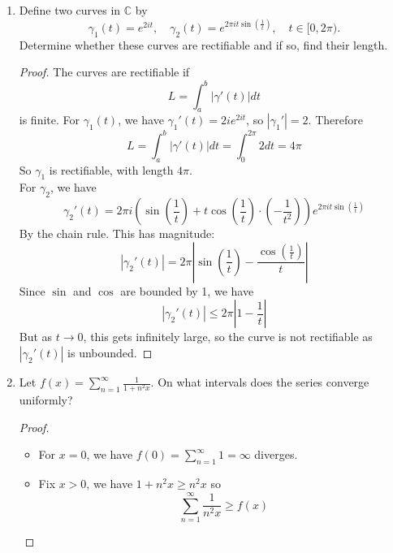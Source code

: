 \documentclass[hidelinks,12pt]{article}
\renewcommand{\geq}{\geqslant}
\renewcommand{\leq}{\leqslant}
\begin{document}
\begin{enumerate}
\begin{proof}
       \begin{align*}
       x_{n+1}f'(x_{n+1})&\geq x_{n+1}f'(x_{n})\\
                       &\geq x_{n}f'(x_{n})\tag{\(x_{n}\leq x_{n+1}\) and \(f'\) monotonic}\\
       &\geq f(x_{n})\tag{Assumption}\\
       &\geq f(x_{n+1})\tag{\(f\) nondecreasing}
       \end{align*}
       So \(xf'(x)\geq f(x)\) for all \(x\) therefore \(g'\) is nonnegative, so \(g\) is monotone increasing.
        \end{proof}
    \item Define two curves in \(\mathbb{C}\) by
        \[
            \gamma_{1}(t)=e^{2it},\quad\gamma_{2}(t)=e^{2\pi it\sin\left( \frac{1}{t} \right)},\quad t\in[0,2\pi).
        \]
        Determine whether these curves are rectifiable and if so, find their length.
        \begin{proof}
       The curves are rectifiable if \[
       L=\int_{a}^{b}|\gamma'(t)|dt
       \]
       is finite. For \(\gamma_{1}(t)\), we have \(\gamma_{1}'(t)=2ie^{2it}\), so \(|\gamma_{1}'|=2\). Therefore \[
       L=\int_{a}^{b}|\gamma'(t)|dt=\int_{0}^{2\pi}2dt=4\pi
       \]
      So \(\gamma_{1}\) is rectifiable, with length \(4\pi\).\\
      For \(\gamma_{2}\), we have \[
      \gamma_{2}'(t)=2\pi i\left(\sin\left(\frac{1}{t}\right)+t\cos\left(\frac{1}{t}\right)\cdot\left(-\frac{1}{t^{2}}\right)\right)e^{2\pi it\sin(\frac{1}{t})}
      \]
     By the chain rule. This has magnitude:
     \[
     |\gamma_{2}'(t)|=2\pi\left|\sin\left(\frac{1}{t}\right)-\frac{\cos\left(\frac{1}{t}\right)}{t}\right|
     \]
    Since \(\sin\) and \(\cos\) are bounded by 1, we have \[
    |\gamma_{2}'(t)|\leq2\pi\left|1-\frac{1}{t}\right|
    \]
    But as \(t\to0\), this gets infinitely large, so the curve is not rectifiable as \(|\gamma_{2}'(t)|\) is unbounded.
        \end{proof}
    \item Let \(f(x)=\sum_{n=1}^{\infty}\frac{1}{1+n^2x}\). On what intervals does the series converge uniformly?
        \begin{proof}
            \begin{itemize}
                \item For \(x=0\), we have \(f(0)=\sum_{n=1}^{\infty}1=\infty\) diverges.
                \item Fix \(x>0\), we have \(1+n^{2}x\geq n^{2}x\) so \[
                \sum_{n=1}^{\infty}\frac{1}{n^{2}x}\geq f(x)
\]
\end{itemize}
\end{proof}
\end{enumerate}
\end{document}
